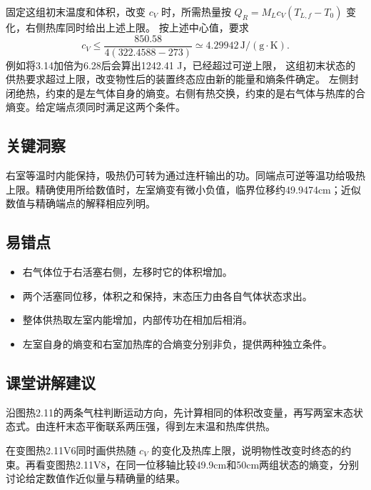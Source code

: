 \documentclass[UTF8,fontset=fandol,a4paper,11pt]{ctexart}
\begin{document}
固定这组初末温度和体积，改变 $c_V$ 时，所需热量按 $Q_R=M_Lc_V(T_{L,f}-T_0)$ 变化，右侧热库同时给出上述上限。
按上述中心值，要求
\[
c_V\le
\frac{850.58}{4(322.4588-273)}
\simeq4.29942\,\mathrm{J/(g\cdot K)}.
\]
例如将3.14加倍为6.28后会算出1242.41 J，已经超过可逆上限，
这组初末状态的供热要求超过上限，改变物性后的装置终态应由新的能量和熵条件确定。
左侧封闭绝热，约束的是左气体自身的熵变。右侧有热交换，约束的是右气体与热库的合熵变。给定端点须同时满足这两个条件。





\subsection*{关键洞察}

右室等温时内能保持，吸热仍可转为通过连杆输出的功。同端点可逆等温功给吸热上限。精确使用所给数值时，左室熵变有微小负值，临界位移约49.9474cm；近似数值与精确端点的解释相应列明。



\subsection*{易错点}

\begin{itemize}
\item 右气体位于右活塞右侧，左移时它的体积增加。
\item 两个活塞同位移，体积之和保持，末态压力由各自气体状态求出。
\item 整体供热取左室内能增加，内部传功在相加后相消。
\item 左室自身的熵变和右室加热库的合熵变分别非负，提供两种独立条件。
\end{itemize}



\subsection*{课堂讲解建议}

沿图热2.11的两条气柱判断运动方向，先计算相同的体积改变量，再写两室末态状态式。由连杆末态平衡联系两压强，得到左末温和热库供热。

在变图热2.11V6同时画供热随 $c_V$ 的变化及热库上限，说明物性改变时终态的约束。再看变图热2.11V8，在同一位移轴比较49.9cm和50cm两组状态的熵变，分别讨论给定数值作近似量与精确量的结果。
\end{document}
